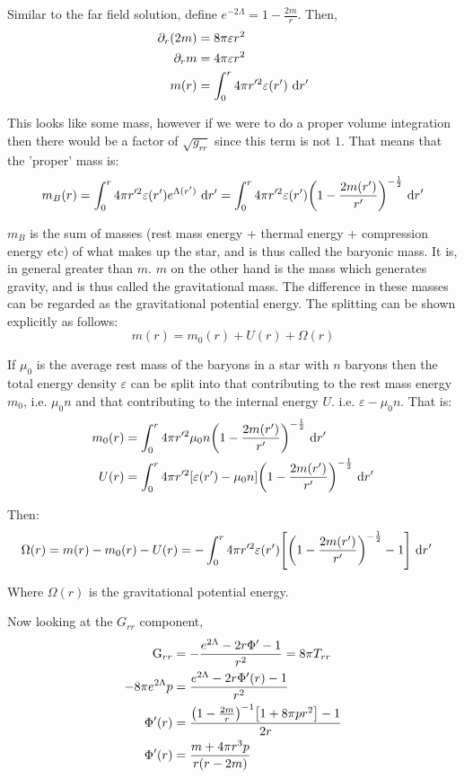 \documentclass[12pt, letterpaper]{report}
\begin{document}
Similar to the far field solution, define $e^{-2\Lambda}= 1- \frac{2m}{r}$. Then,
\begin{align*}
    \partial_r\qty(2m) &= 8\pi\varepsilon r^2\\
    \partial_r m &= 4\pi\varepsilon r^2\\
    m(r) &= \int_0^r 4\pi r'^2 \varepsilon(r')\ \dd r'
\end{align*}

This looks like some mass, however if we were to do a proper volume integration then there would be a factor of $\sqrt{g_{rr}}$ since this term is not $1$. That means that the 'proper' mass is: 
$$m_B(r)= \int_0^r 4\pi r'^2\varepsilon(r')e^{\Lambda(r')}\ \dd r' = \int_0^r 4\pi r'^2\varepsilon(r')\qty(1-\frac{2m(r')}{r'})^{-\frac{1}{2}}\ \dd r'$$

$m_B$ is the sum of masses (rest mass energy + thermal energy + compression energy etc) of what makes up the star, and is thus called the baryonic mass. It is, in general greater than $m$. $m$ on the other hand is the mass which generates gravity, and is thus called the gravitational mass. The difference in these masses can be regarded as the gravitational potential energy. The splitting can be shown explicitly as follows: 
$$m(r)= m_0(r)+ U(r)+ \Omega(r)$$

If $\mu_0$ is the average rest mass of the baryons in a star with $n$ baryons then the total energy density $\varepsilon$ can be split into that contributing to the rest mass energy $m_0$, i.e. $\mu_0 n$ and that contributing to the internal energy $U$. i.e. $\varepsilon-\mu_0 n$. That is: 
\begin{align*}
    m_0(r)&= \int_0^r 4\pi r'^2 \mu_0 n\qty(1-\frac{2m(r')}{r'})^{-\frac{1}{2}}\ \dd r'\\
    U(r)&= \int_0^r 4\pi r'^2[\varepsilon(r')-\mu_0 n]\qty(1-\frac{2m(r')}{r'})^{-\frac{1}{2}}\ \dd r'
\end{align*}

Then: 
\begin{align*}
    \Omega(r)&= m(r)- m_0(r)- U(r)= -\int_0^r 4\pi r'^2\varepsilon(r')\qty[\qty(1-\frac{2m(r')}{r'})^{-\frac{1}{2}}-1]\ \dd r'
\end{align*}

Where $\Omega(r)$ is the gravitational potential energy. 

Now looking at the $G_{rr}$ component, 
\begin{align*}
    \text{G}_{rr} &= -\frac{e^{2 \Lambda }-2 r \Phi '-1}{r^2}= 8\pi T_{rr}\\
    -8\pi e^{2\Lambda}p &= \frac{e^{2\Lambda}-2 r \Phi '(r)-1}{r^2}\\
    \Phi '(r)&=\frac{\qty(1-\frac{2m}{r})^{-1}\qty[1+8 \pi p r^2]-1}{2 r}\\
    \Phi'(r) &=\frac{m+4 \pi r^3p}{r (r- 2 m)}
\end{align*}
\end{document}
